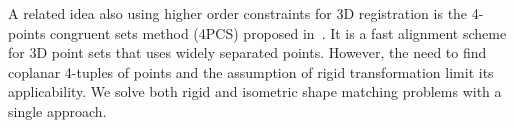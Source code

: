 A related idea also using higher order constraints for 3D registration is the 4-points congruent sets method (4PCS) proposed in~\cite{Aiger08}.
It is a fast alignment scheme for 3D point sets that uses widely separated points.
However, the need to find coplanar 4-tuples of points and the assumption of rigid transformation limit its applicability.
We solve both rigid and isometric shape matching problems with a single approach.

